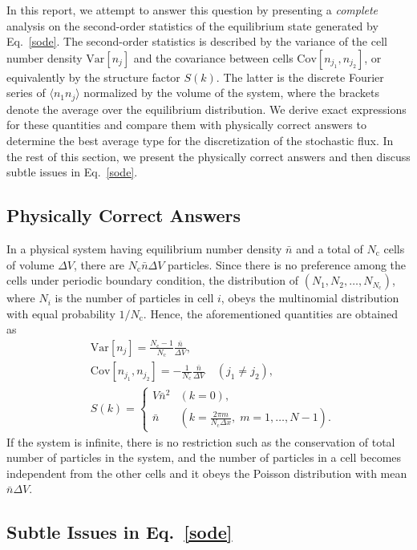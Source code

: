 \documentclass{article}
\newcommand{\Var}{\mathrm{Var}}
\newcommand{\Cov}{\mathrm{Cov}}
\newcommand{\dx}{{\Delta x}}
\newcommand{\dV}{{\Delta V}}
\newcommand{\Nc}{{N_\mathrm{c}}}
\newcommand{\nb}{\bar{n}}
\begin{document}
In this report, we attempt to answer this question by presenting a \textit{complete} analysis on the second-order statistics of the equilibrium state generated by Eq.~\eqref{sode}.
The second-order statistics is described by the variance of the cell number density $\Var[n_j]$ and the covariance between cells $\Cov[n_{j_1},n_{j_2}]$, or equivalently by the structure factor $S(k)$.
The latter is the discrete Fourier series of $\langle n_1 n_j\rangle$ normalized by the volume of the system, where the brackets denote the average over the equilibrium distribution.
We derive exact expressions for these quantities and compare them with physically correct answers to determine the best average type for the discretization of the stochastic flux.
In the rest of this section, we present the physically correct answers and then discuss subtle issues in Eq.~\eqref{sode}.

\subsection*{Physically Correct Answers}

In a physical system having equilibrium number density $\nb$ and a total of $\Nc$ cells of volume $\dV$, there are $\Nc\nb\dV$ particles.
Since there is no preference among the cells under periodic boundary condition, the distribution of $(N_1,N_2,\dots,N_\Nc)$, where $N_i$ is the number of particles in cell $i$, obeys the multinomial distribution with equal probability $1/\Nc$.
Hence, the aforementioned quantities are obtained as
\begin{align}
\label{theovar}
&\Var[n_j]=\frac{\Nc-1}{\Nc}\frac{\nb}{\dV},\\
\label{theocov}
&\Cov[n_{j_1},n_{j_2}]=-\frac{1}{\Nc}\frac{\nb}{\dV}\quad(j_1\ne j_2),\\
\label{theoSk}
&S(k)=
\begin{cases}
V\nb^2 & (k=0),\\
\nb & \left(k={\displaystyle\frac{2\pi m}{\Nc\dx}},\;m=1,\dots,N-1\right).
\end{cases}
\end{align}
If the system is infinite, there is no restriction such as the conservation of total number of particles in the system, and the number of particles in a cell becomes independent from the other cells and it obeys the Poisson distribution with mean $\nb\dV$.

\subsection*{Subtle Issues in Eq.~\eqref{sode}}
\end{document}
